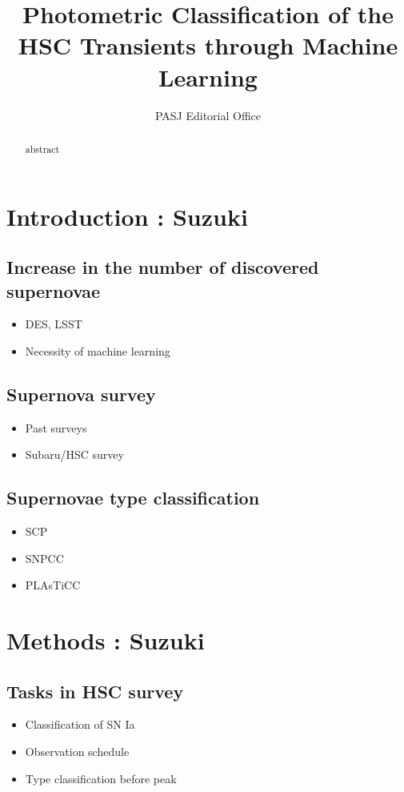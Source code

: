 \documentclass{pasj01}
\begin{document}
\title{Photometric Classification of the HSC Transients through Machine Learning}
\author{PASJ Editorial Office}%


\maketitle

\begin{abstract}
abstract  
\end{abstract}

\section{Introduction : Suzuki}
\subsection{Increase in the number of discovered supernovae}
\begin{itemize}
\item DES, LSST
\item Necessity of machine learning
\end{itemize}
\subsection{Supernova survey}
\begin{itemize}
\item Past surveys
\item Subaru/HSC survey
\end{itemize}
\subsection{Supernovae type classification}
\begin{itemize}
\item SCP
\item SNPCC
\item PLAsTiCC
\end{itemize}
%
\section{Methods : Suzuki}
\subsection{Tasks in HSC survey}
\begin{itemize}
\item Classification of SN Ia
\item Observation schedule
\item Type classification before peak
\end{itemize}
\end{document}
